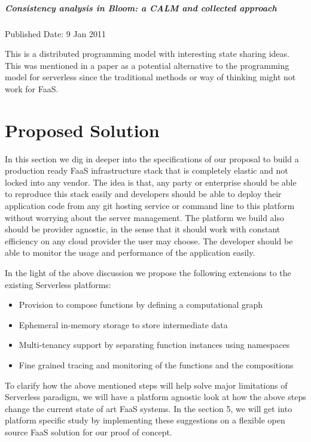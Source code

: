 \documentclass[12pt,titlepage]{article}
\begin{document}
\subparagraph{Consistency analysis in Bloom: a CALM and collected approach}
\label{sec:orgd008ec3}

Published Date: 9 Jan 2011

This is a distributed programming model with interesting state sharing ideas. This was mentioned in a paper as a potential alternative to the programming model for serverless since the traditional methods or way of thinking might not work for FaaS.

\section{Proposed Solution}
\label{sec:org74fc92c}

In this section we dig in deeper into the specifications of our proposal to
build a production ready FaaS infrastructure stack that is completely elastic
and not locked into any vendor. The idea is that, any party or enterprise should
be able to reproduce this stack easily and developers should be able to deploy their
application code from any git hosting service or command line to this platform
without worrying about the server management. The platform we build also should
be provider agnostic, in the sense that it should work with constant efficiency
on any cloud provider the user may choose. The developer should be able to
monitor the usage and performance of the application easily.

In the light of the above discussion we propose the following extensions to the
existing Serverless platforms:
\begin{itemize}
\item Provision to compose functions by defining a computational graph
\item Ephemeral in-memory storage to store intermediate data
\item Multi-tenancy support by separating function instances using namespaces
\item Fine grained tracing and monitoring of the functions and the compositions
\end{itemize}

To clarify how the above mentioned steps will help solve major limitations of
Serverless paradigm, we will have a platform agnostic look at how the above
steps change the current state of art FaaS systems. In the section 5, we will
get into platform specific study by implementing these suggestions on a flexible
open source FaaS solution for our proof of concept.
\end{document}
